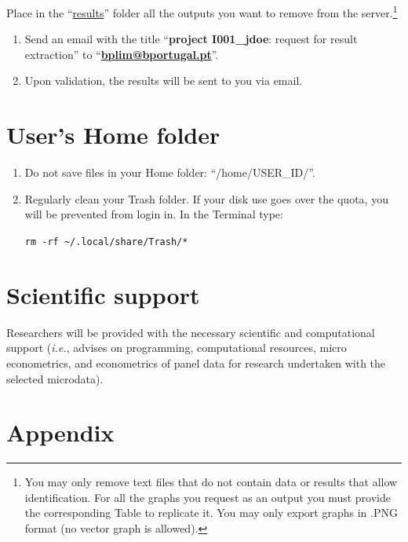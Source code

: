 \documentclass[
  11pt,
  a4paper,
]{article}
\begin{document}
Place in the ``\ul{results}'' folder all the outputs you want to remove
from the server.\footnote{You may only remove text files that do not
  contain data or results that allow identification. For all the graphs
  you request as an output you must provide the corresponding Table to
  replicate it. You may only export graphs in .PNG format (no vector
  graph is allowed).}

\begin{enumerate}
\def\labelenumi{\arabic{enumi}.}
\item
  Send an email with the title ``\textbf{project I001\_jdoe}: request
  for result extraction'' to ``\textbf{\ul{bplim@bportugal.pt}}''.
\item
  Upon validation, the results will be sent to you via email.
\end{enumerate}

\hypertarget{users-home-folder}{%
\section{User's Home folder}\label{users-home-folder}}

\begin{enumerate}
\def\labelenumi{\arabic{enumi}.}
\item
  Do not save files in your Home folder: ``/home/USER\_ID/''.
\item
  Regularly clean your Trash folder. If your disk use goes over the
  quota, you will be prevented from login in. In the Terminal type:

  \texttt{rm\ -rf\ \textasciitilde{}/.local/share/Trash/*}
\end{enumerate}

\hypertarget{scientific-support}{%
\section{Scientific support}\label{scientific-support}}

Researchers will be provided with the necessary scientific and
computational support (\emph{i.e.}, advises on programming,
computational resources, micro econometrics, and econometrics of panel
data for research undertaken with the selected microdata).

\hypertarget{appendix}{%
\section{Appendix}\label{appendix}}
\end{document}
